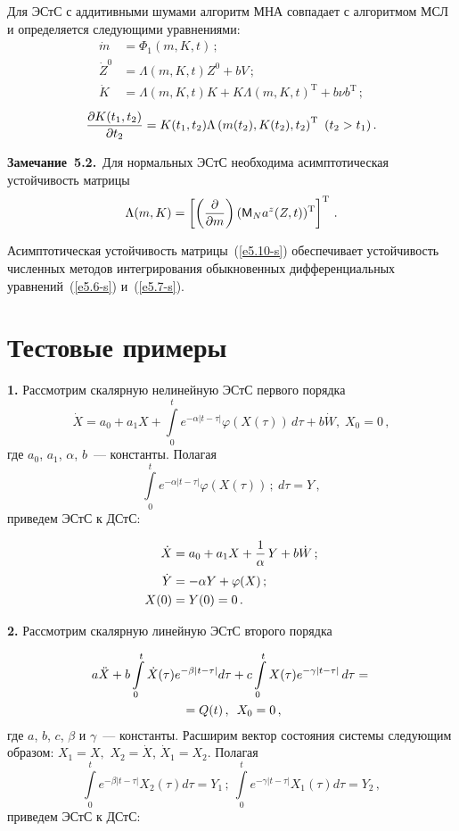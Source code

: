 \begin{multicols}{2}
Для ЭСтС с аддитивными шумами алгоритм МНА совпадает с алгоритмом МСЛ и определяется 
следующими уравнениями:
    \begin{align}
    \dot m &=\Phi_{1} (m,K,t)\,;\label{e5.6-s}\\
\dot Z^0 &=\Lambda (m,K,t)Z^0 + b V\,;\label{e5.7-s}\\
    \dot K &=\Lambda (m,K,t)K+ K\Lambda (m,K,t)^{\mathrm{T}} + b\nu b^{\mathrm{T}}\,;\label{e5.8-s}
    \end{align}
    $$
\displaystyle\frac{\displaystyle \partial K(t_1, t_2)\mathstrut}{\displaystyle \partial t_2\mathstrut} 
= K(t_1, t_2) \Lambda  \left(m(t_2), K(t_2), t_2\right)^{\mathrm{T}} \ (t_2>t_1)\,.
$$

\noindent
\textbf{Замечание~5.2.}\
 Для нормальных ЭСтС необходима асимптотическая устойчивость матрицы
    \begin{equation}
    \Lambda (m,K) =\left[ \left( \displaystyle\frac{\displaystyle \partial\mathstrut}{\displaystyle \partial m\mathstrut}\right) ( {\sf M}_N a^z (Z,t))^{\mathrm{T}}\right]^{\mathrm{T}}\,.
    \label{e5.10-s}
    \end{equation}

Асимптотическая устойчивость матрицы~(\ref{e5.10-s}) 
обеспечивает устойчивость численных методов интегрирования обыкновенных 
дифференциальных уравнений~(\ref{e5.6-s}) и~(\ref{e5.7-s}).


\section{Тестовые примеры}

{\bf 1.} Рассмотрим скалярную нелинейную ЭСтС первого порядка
    $$
    \dot{X} = a_0 + a_1 X + \int\limits_{0}^{t} e^{-\alpha |t-\tau|} \varphi(X(\tau))\, d\tau + b\dot{W}, \; X_0 = 0\,,
    $$
где $a_0$, $a_1$, $\alpha$, $b$~--- константы. Полагая
    $$\int\limits_{0}^{t} e^{-\alpha |t-\tau|} \varphi(X(\tau))\,;\ d \tau = Y\,,
    $$
приведем ЭСтС к ДСтС:

\noindent
\begin{align*}
\dot{X} &= a_0 + a_1 X + \displaystyle\frac{\displaystyle 1\mathstrut}{\displaystyle \alpha\mathstrut}\, Y + b\dot{W}\,; \\
\dot{Y} &=   -\alpha Y + \varphi(X)\,;\\
X(0) &= Y(0) = 0\,.
\end{align*}

{\bf 2.}
 Рассмотрим скалярную линейную ЭСтС второго порядка
 
 \noindent
    \begin{multline*}
    a\ddot{X}+b \int\limits_{0}^{t}\dot{X}(\tau) e^{-\beta |t-\tau|} d\tau + 
    c \int\limits_{0}^{t} X(\tau) e^{-\gamma|t-\tau|}\,d\tau ={}\\
    {}= Q(t)\,,  \enskip
    X_0 = 0\,,
\end{multline*}
где $a$, $b$, $c$, $\beta$ и $\gamma$~--- константы. Расширим вектор 
со\-сто\-яния сис\-те\-мы следующим образом:
    $X_1 = X,$ $X_2 = \dot{X}$, $\dot{X}_1 = X_2.$
Полагая 
$$
\int\limits_{0}^{t} e^{-\beta |t-\tau|} X_2(\tau) d \tau = Y_1\,;\
\int\limits_{0}^{t} e^{-\gamma |t-\tau|} X_1(\tau) d \tau = Y_2\,,
$$
приведем ЭСтС к ДСтС:


\end{multicols}

